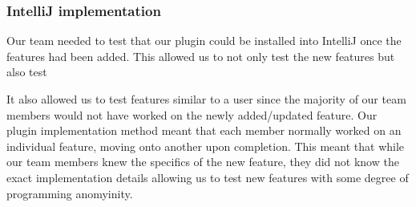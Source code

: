 \subsubsection{IntelliJ implementation}
Our team needed to test that our plugin could be installed into IntelliJ once the features had been added. This allowed us to not only test the new features but also test


It also allowed us to test features similar to a user since the majority of our team members would not have worked on the newly added/updated feature. Our plugin implementation method meant that each member normally worked on an individual feature, moving onto another upon completion. This meant that while our team members knew the specifics of the new feature, they did not know the exact implementation details allowing us to test new features with some degree of programming anomyinity. 
\\
